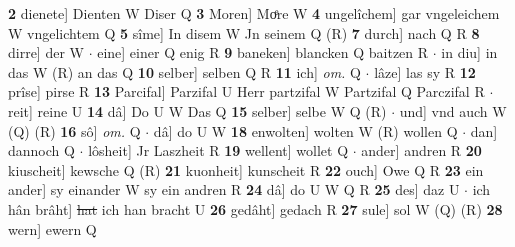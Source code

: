 \documentclass[8pt,a4paper,notitlepage]{article}
\begin{document}
\begin{table}[ht]
\begin{minipage}[t]{0.5\linewidth}
\textbf{2} dienete] Dienten W Diser Q \textbf{3} Moren] Moͤre W \textbf{4} ungelîchem] gar vngeleichem W vngelichtem Q \textbf{5} sîme] In disem W Jn seinem Q (R) \textbf{7} durch] nach Q R \textbf{8} dirre] der W  $\cdot$ eine] einer Q enig R \textbf{9} baneken] blancken Q baitzen R  $\cdot$ in diu] in das W (R) an das Q \textbf{10} selber] selben Q R \textbf{11} ich] \textit{om.} Q  $\cdot$ lâze] las sy R \textbf{12} prîse] pirse R \textbf{13} Parcifal] Parzifal U Herr partzifal W Partzifal Q Parczifal R  $\cdot$ reit] reine U \textbf{14} dâ] Do U W Das Q \textbf{15} selber] selbe W Q (R)  $\cdot$ und] vnd auch W (Q) (R) \textbf{16} sô] \textit{om.} Q  $\cdot$ dâ] do U W \textbf{18} enwolten] wolten W (R) wollen Q  $\cdot$ dan] dannoch Q  $\cdot$ lôsheit] Jr Laszheit R \textbf{19} wellent] wollet Q  $\cdot$ ander] andren R \textbf{20} kiuscheit] kewsche Q (R) \textbf{21} kuonheit] kunscheit R \textbf{22} ouch] Owe Q R \textbf{23} ein ander] sy einander W sy ein andren R \textbf{24} dâ] do U W Q R \textbf{25} des] daz U  $\cdot$ ich hân brâht] \sout{hat} ich han bracht U \textbf{26} gedâht] gedach R \textbf{27} sule] sol W (Q) (R) \textbf{28} wern] ewern Q \newline
\end{minipage}
\end{table}
\end{document}
